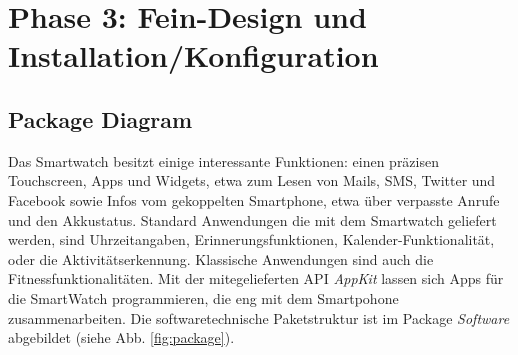 \chapter{Phase 3: Fein-Design und Installation/Konfiguration}

\section{Package Diagram}
Das Smartwatch besitzt einige interessante Funktionen: einen präzisen Touchscreen, Apps und Widgets, etwa zum Lesen von Mails, SMS, Twitter und Facebook sowie Infos vom gekoppelten Smartphone, etwa über verpasste Anrufe und den Akkustatus.
Standard Anwendungen die mit dem Smartwatch geliefert werden, sind Uhrzeitangaben, Erinnerungsfunktionen, Kalender-Funktionalität, oder die Aktivitätserkennung.
Klassische Anwendungen sind auch die Fitnessfunktionalitäten.
Mit der mitegelieferten API \textit{AppKit} lassen sich Apps für die SmartWatch programmieren, die eng mit dem Smartpohone zusammenarbeiten.
Die softwaretechnische Paketstruktur ist im Package \textit{Software} abgebildet (siehe Abb. \ref{fig:package}).







